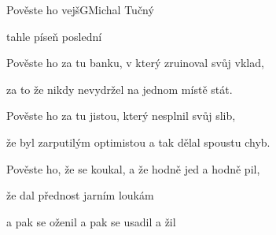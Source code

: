 \begin{song}{Pověste ho vejš}{G}{Michal Tučný}
\begin{SBChorus}
tahle  píseň poslední
\end{SBChorus}

\begin{SBVerse}

Pověste ho za tu banku, v který zruinoval svůj vklad,

za to že nikdy nevydržel na jednom místě stát.

\end{SBVerse}

\begin{SBVerse}

Pověste ho za tu jistou, který nesplnil svůj slib,

že byl zarputilým optimistou a tak dělal spoustu chyb.

\end{SBVerse}

\begin{SBVerse}

Pověste ho, že se koukal, a že hodně jed a hodně pil,

že dal přednost jarním loukám

a pak se oženil a pak se usadil a žil

\end{SBVerse}

\begin{SBChorus}

\end{SBChorus}

\end{song}

\clearpage
